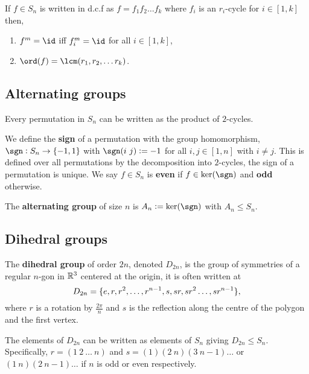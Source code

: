 \documentclass[../Year1/Year1.tex]{subfiles}
\begin{document}
\begin{theorem}
    If $f\in S_n$ is written in d.c.f as $f=f_1f_2\ldots f_k$ where $f_i$ is an $r_i$-cycle for $i\in[1,k]$ then, \begin{enumerate}
        \item $f^m=\id$ iff $f_i^m=\id$ for all $i\in[1,k]$,
        \item $\ord(f) = \lcm(r_1,r_2,\ldots r_k)$.
    \end{enumerate}
\end{theorem}

\subsection{Alternating groups}

\begin{theorem}
    Every permutation in $S_n$ can be written as the product of $2$-cycles.
\end{theorem}

\begin{definition}
    We define the \textbf{sign} of a permutation with the group homomorphism, $\sgn:S_n\rightarrow\{-1,1\}$ with $\sgn(i \ j) := -1$ for all $i,j\in[1,n]$ with $i\neq j$. This is defined over all permutations by the decomposition into $2$-cycles, the sign of a permutation is unique. We say $f\in S_n$ is \textbf{even} if $f\in\ker(\sgn)$ and \textbf{odd} otherwise.
\end{definition}

\begin{definition}
    The \textbf{alternating group} of size $n$ is $A_n := \ker(\sgn)$ with $A_n\leq S_n$.
\end{definition}

\subsection{Dihedral groups}

\begin{definition}
    The \textbf{dihedral group} of order $2n$, denoted $D_{2n}$, is the group of symmetries of a regular $n$-gon in $\mathbb{R}^3$ centered at the origin, it is often written at \[
        D_{2n} = \{e,r,r^2,\ldots,r^{n-1},s,sr,sr^2\ldots,sr^{n-1}\}
    \textcolor{black}{,}
    \] where $r$ is a rotation by $\frac{2\pi}{n}$ and $s$ is the reflection along the centre of the polygon and the first vertex.
\end{definition}

\begin{theorem}
    The elements of $D_{2n}$ can be written as elements of $S_n$ giving $D_{2n}\leq S_n$. Specifically, $r = (1 \ 2 \ \ldots \ n)$ and $s = (1)(2 \ n)(3 \ n-1)\ldots$ or $(1 \ n)(2 \ n-1)\ldots$ if $n$ is odd or even respectively.
\end{theorem}
\end{document}
